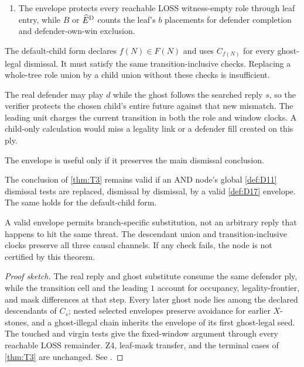 \begin{definition}
\begin{enumerate}[label=\textup{(\arabic*)},leftmargin=10mm]
  \item The envelope protects every reachable LOSS witness-empty role through
  leaf entry, while $\widehat B$ or $\widehat E^{\mathrm{D}}$ counts the leaf's $b$
  placements for defender completion and defender-own-win exclusion.
\end{enumerate}
The default-child form declares $f(N)\in F(N)$ and uses $C_{f(N)}$ for every
ghost-legal dismissal.  It must satisfy the same transition-inclusive checks.
Replacing a whole-tree role union by a child union without these checks is
insufficient.
\end{definition}

\begin{plainterms}
The real defender may play $d$ while the ghost follows the searched reply
$s$, so the verifier protects the chosen child's entire future against that
new mismatch.  The leading unit charges the current transition in both the
role and window clocks.  A child-only calculation would miss a legality link
or a defender fill created on this ply.
\end{plainterms}

The envelope is useful only if it preserves the main dismissal conclusion.

\begin{theorem}
\label{thm:T9}
\upshape
The conclusion of \cref{thm:T3} remains valid if an AND node's global
\cref{def:D11} dismissal tests are replaced, dismissal by dismissal, by a
valid \cref{def:D17} envelope.  The same holds for the default-child form.
\end{theorem}

\begin{plainterms}
A valid envelope permits branch-specific substitution, not an arbitrary reply
that happens to hit the same threat.  The descendant union and
transition-inclusive clocks preserve all three causal channels.  If any check
fails, the node is not certified by this theorem.
\end{plainterms}

\begin{proof}[Proof sketch]
The real reply and ghost substitute consume the same defender ply, while the
transition cell and the leading $1$ account for occupancy, legality-frontier,
and mask differences at that step.  Every later ghost node lies among the
declared descendants of $C_s$; nested selected envelopes preserve avoidance
for earlier $X$-stones, and a ghost-illegal chain inherits the envelope of its
first ghost-legal seed.  The touched and virgin tests give the fixed-window
argument through every reachable LOSS remainder.  Z4, leaf-mask transfer, and
the terminal cases of \cref{thm:T3} are unchanged.  See
\cite{hexobot-companions}.
\end{proof}

